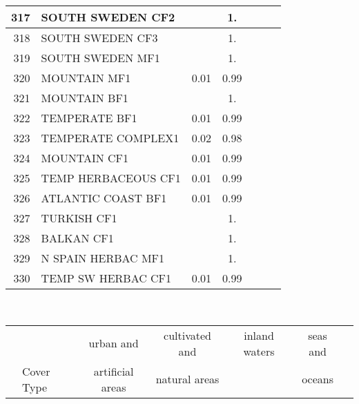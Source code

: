 {{\begin{tabular}{||r|l||c|c|c|c|c||}
 \hline
         317  & SOUTH SWEDEN CF2                                             &       &  1.   &       &       \\
 \hline
         318  & SOUTH SWEDEN CF3                                             &       &  1.   &       &       \\
 \hline
         319  & SOUTH SWEDEN MF1                                             &       &  1.   &       &       \\
 \hline
         320  & MOUNTAIN MF1                                                 &  0.01 &  0.99 &       &       \\
 \hline
         321  & MOUNTAIN BF1                                                 &       &  1.   &       &       \\
 \hline
         322  & TEMPERATE BF1                                                &  0.01 &  0.99 &       &       \\
 \hline
         323  & TEMPERATE COMPLEX1                                           &  0.02 &  0.98 &       &       \\
 \hline
         324  & MOUNTAIN CF1                                                 &  0.01 &  0.99 &       &       \\
 \hline
         325  & TEMP HERBACEOUS CF1                                          &  0.01 &  0.99 &       &       \\
 \hline
         326  & ATLANTIC COAST BF1                                           &  0.01 &  0.99 &       &       \\
 \hline
         327  & TURKISH CF1                                                  &       &  1.   &       &       \\
 \hline
         328  & BALKAN CF1                                                   &       &  1.   &       &       \\
 \hline
         329  & N SPAIN HERBAC MF1                                           &       &  1.   &       &       \\
 \hline
         330  & TEMP SW HERBAC CF1                                           &  0.01 &  0.99 &       &       \\
 \hline
 \end{tabular}
 \clearpage
 \medskip\
 \begin{tabular}{||r|l||c|c|c|c|c||}
 \hline
 \hline
 && urban and & cultivated and &inland waters&seas and\\
 &Cover Type& artificial areas & natural areas&&oceans\\

\end{tabular}}}
